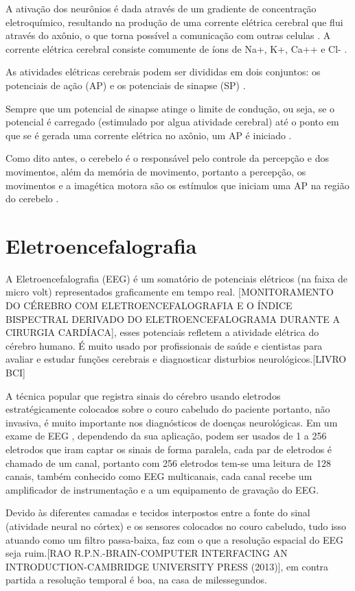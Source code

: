 A ativação dos neurônios é dada através de um gradiente de concentração eletroquímico, resultando na produção de uma corrente elétrica cerebral que flui através do axônio, o que torna possível a comunicação com outras celulas \cite{SIULYDissertacao}. A corrente elétrica cerebral consiste comumente de íons de Na+, K+, Ca++ e Cl- \cite{EEGSignals}.

As atividades elétricas cerebrais podem ser divididas em dois conjuntos: os potenciais de ação (AP) e os potenciais de sinapse (SP) \cite{SIULYDissertacao}.

Sempre que um potencial de sinapse atinge o limite de condução, ou seja, se o potencial é carregado (estimulado por algua atividade cerebral) até o ponto em que se é gerada uma corrente elétrica no axônio, um AP é iniciado \cite{SIULYDissertacao}.

Como dito antes, o cerebelo é o responsável pelo controle da percepção e dos movimentos, além da memória de movimento, portanto a percepção, os movimentos e a imagética motora são os estímulos que iniciam uma AP na região do cerebelo \cite{alvarezneurobiomecanismos}.

\section{Eletroencefalografia}
A Eletroencefalografia (EEG) é um somatório de potenciais elétricos
 (na faixa de micro volt) representados graficamente em tempo real.
 [MONITORAMENTO DO CÉREBRO COM ELETROENCEFALOGRAFIA E O ÍNDICE BISPECTRAL
 DERIVADO DO ELETROENCEFALOGRAMA DURANTE A CIRURGIA CARDÍACA], esses potenciais
 refletem a atividade elétrica do cérebro humano. É muito usado por profissionais
 de saúde e cientistas para avaliar e estudar funções cerebrais e diagnosticar
 disturbios neurológicos.[LIVRO BCI] 

A técnica popular que registra sinais do cérebro usando eletrodos estratégicamente
 colocados sobre o couro cabeludo do paciente portanto, não invasiva, é muito
 importante nos diagnósticos de doenças neurológicas. Em um exame de EEG ,
 dependendo da sua aplicação, podem ser usados de 1 a 256 eletrodos que iram
 captar os sinais de forma paralela, cada par de eletrodos é chamado de um canal,
 portanto com 256 eletrodos tem-se uma leitura de 128 canais, também conhecido como
 EEG multicanais, cada canal recebe um amplificador de instrumentação e a um equipamento
 de gravação do EEG.

Devido às diferentes camadas e tecidos interpostos entre a fonte do sinal
 (atividade neural no córtex) e os sensores colocados no couro cabeludo,
 tudo isso atuando como um filtro passa-baixa, faz com o que a resolução
 espacial do EEG seja ruim.[RAO R.P.N.-BRAIN-COMPUTER INTERFACING AN
 INTRODUCTION-CAMBRIDGE UNIVERSITY PRESS (2013)], em contra partida a
 resolução temporal é boa, na casa de milessegundos.

